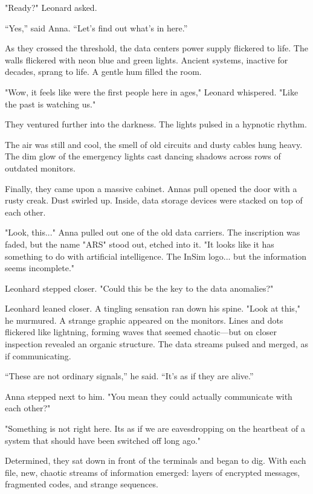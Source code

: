 \documentclass[
]{article}
\begin{document}
"Ready?" Leonard asked.

``Yes,'' said Anna. ``Let's find out what's in here.''

As they crossed the threshold, the data center\textquotesingle s power supply flickered to life. The walls flickered with neon blue and green lights. Ancient systems, inactive for decades, sprang to life. A gentle hum filled the room.

"Wow, it feels like we\textquotesingle re the first people here in ages," Leonard whispered. "Like the past is watching us."

They ventured further into the darkness. The lights pulsed in a hypnotic rhythm.

The air was still and cool, the smell of old circuits and dusty cables hung heavy. The dim glow of the emergency lights cast dancing shadows across rows of outdated monitors.

Finally, they came upon a massive cabinet. Anna\textquotesingle s pull opened the door with a rusty creak. Dust swirled up. Inside, data storage devices were stacked on top of each other.

"Look, this..." Anna pulled out one of the old data carriers. The inscription was faded, but the name "ARS" stood out, etched into it. "It looks like it has something to do with artificial intelligence. The InSim logo... but the information seems incomplete."

Leonhard stepped closer. "Could this be the key to the data anomalies?"

Leonhard leaned closer. A tingling sensation ran down his spine. "Look at this," he murmured. A strange graphic appeared on the monitors. Lines and dots flickered like lightning, forming waves that seemed chaotic---but on closer inspection revealed an organic structure. The data streams pulsed and merged, as if communicating.

``These are not ordinary signals,'' he said. ``It's as if they are alive.''

Anna stepped next to him. "You mean they could actually communicate with each other?"

"Something is not right here. It\textquotesingle s as if we are eavesdropping on the heartbeat of a system that should have been switched off long ago."

Determined, they sat down in front of the terminals and began to dig. With each file, new, chaotic streams of information emerged: layers of encrypted messages, fragmented codes, and strange sequences.
\end{document}
